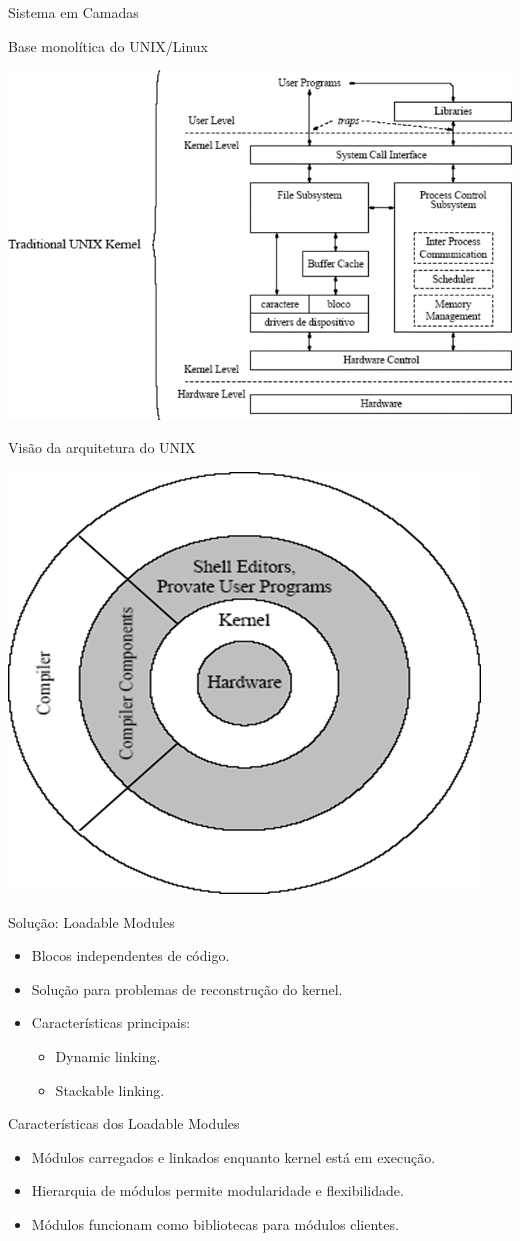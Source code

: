 \documentclass{beamer}
\begin{document}
\begin{frame}{Sistema em Camadas}
\begin{frame}{Base monolítica do UNIX/Linux}
    \begin{center}
        \includegraphics[width=0.6\linewidth]{assets/aula-tads-sope/SO-unix-linux-2.png}
    \end{center}
\end{frame}
\begin{frame}{Visão da arquitetura do UNIX}
    
    \begin{center}
        \includegraphics[width=0.45\linewidth]{assets/aula-tads-sope/SO-unix-linux-3.png}
    \end{center}
\end{frame}
\begin{frame}{Solução: Loadable Modules}
    \begin{itemize}
        \item Blocos independentes de código.
        \item Solução para problemas de reconstrução do kernel.
        \item Características principais:
            \begin{itemize}
                \item Dynamic linking.
                \item Stackable linking.
            \end{itemize}
    \end{itemize}
\end{frame}

\begin{frame}{Características dos Loadable Modules}
    \begin{itemize}
        \item Módulos carregados e linkados enquanto kernel está em execução.
        \item Hierarquia de módulos permite modularidade e flexibilidade.
        \item Módulos funcionam como bibliotecas para módulos clientes.
    \end{itemize}
\end{frame}


\end{frame}
\end{document}
